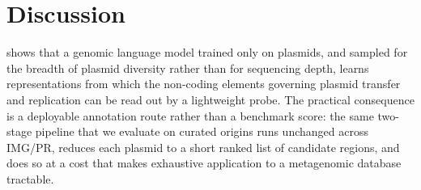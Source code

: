 %
%
%

\section*{Discussion}
\label{sec:discussion}

\model shows that a genomic language model trained only on plasmids, and
sampled for the breadth of plasmid diversity rather than for sequencing
depth, learns representations from which the non-coding elements governing
plasmid transfer and replication can be read out by a lightweight probe. The
practical consequence is a deployable annotation route rather than a
benchmark score: the same two-stage pipeline that we evaluate on curated
origins runs unchanged across IMG/PR, reduces each plasmid to a short ranked
list of candidate regions, and does so at a cost that makes exhaustive
application to a metagenomic database tractable.

